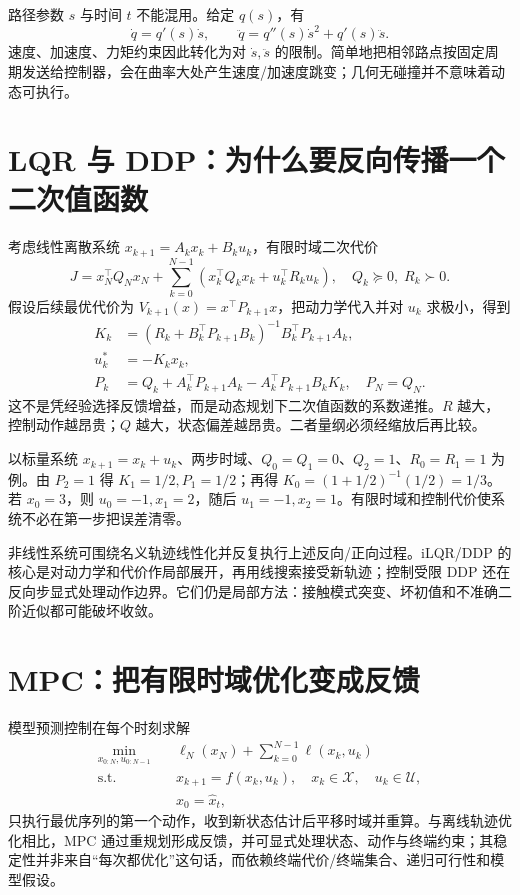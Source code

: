 路径参数 $s$ 与时间 $t$ 不能混用。给定 $q(s)$，有
\begin{equation}
\dot q=q'(s)\dot s,\qquad
\ddot q=q''(s)\dot s^2+q'(s)\ddot s.
\label{eq:time-parameterization}
\end{equation}
速度、加速度、力矩约束因此转化为对 $\dot s,\ddot s$ 的限制。简单地把相邻路点按固定周期发送给控制器，会在曲率大处产生速度/加速度跳变；几何无碰撞并不意味着动态可执行。

\section{LQR 与 DDP：为什么要反向传播一个二次值函数}

考虑线性离散系统 $x_{k+1}=A_kx_k+B_ku_k$，有限时域二次代价
\begin{equation}
J=x_N^\top Q_Nx_N+\sum_{k=0}^{N-1}
\left(x_k^\top Q_kx_k+u_k^\top R_ku_k\right),
\quad Q_k\succeq0,\;R_k\succ0.
\label{eq:lqr-cost}
\end{equation}
假设后续最优代价为 $V_{k+1}(x)=x^\top P_{k+1}x$，把动力学代入并对 $u_k$ 求极小，得到
\begin{align}
K_k&=(R_k+B_k^\top P_{k+1}B_k)^{-1}B_k^\top P_{k+1}A_k,\\
u_k^*&=-K_kx_k,\\
P_k&=Q_k+A_k^\top P_{k+1}A_k-A_k^\top P_{k+1}B_kK_k,
\quad P_N=Q_N.
\label{eq:riccati-recursion}
\end{align}
这不是凭经验选择反馈增益，而是动态规划下二次值函数的系数递推。$R$ 越大，控制动作越昂贵；$Q$ 越大，状态偏差越昂贵。二者量纲必须经缩放后再比较。

以标量系统 $x_{k+1}=x_k+u_k$、两步时域、$Q_0=Q_1=0$、$Q_2=1$、$R_0=R_1=1$ 为例。由 $P_2=1$ 得 $K_1=1/2,P_1=1/2$；再得 $K_0=(1+1/2)^{-1}(1/2)=1/3$。若 $x_0=3$，则 $u_0=-1,x_1=2$，随后 $u_1=-1,x_2=1$。有限时域和控制代价使系统不必在第一步把误差清零。

非线性系统可围绕名义轨迹线性化并反复执行上述反向/正向过程。iLQR/DDP 的核心是对动力学和代价作局部展开，再用线搜索接受新轨迹；控制受限 DDP 还在反向步显式处理动作边界\cite{tassa2014control}。它们仍是局部方法：接触模式突变、坏初值和不准确二阶近似都可能破坏收敛。

\section{MPC：把有限时域优化变成反馈}

模型预测控制在每个时刻求解
\begin{equation}
\begin{aligned}
\min_{x_{0:N},u_{0:N-1}}\quad&\ell_N(x_N)+\sum_{k=0}^{N-1}\ell(x_k,u_k)\\
\text{s.t.}\quad&x_{k+1}=f(x_k,u_k),\quad x_k\in\mathcal X,\quad u_k\in\mathcal U,\\
&x_0=\hat x_t,
\end{aligned}
\label{eq:mpc}
\end{equation}
只执行最优序列的第一个动作，收到新状态估计后平移时域并重算。与离线轨迹优化相比，MPC 通过重规划形成反馈，并可显式处理状态、动作与终端约束；其稳定性并非来自“每次都优化”这句话，而依赖终端代价/终端集合、递归可行性和模型假设\cite{mayne2000mpc}。


